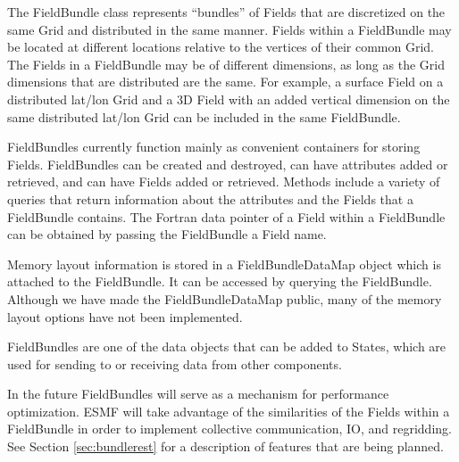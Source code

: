 
The FieldBundle class represents ``bundles'' of Fields that are 
discretized on the same Grid and distributed in the same manner.  
Fields within a FieldBundle may be located at different locations relative 
to the vertices of their common Grid.  The Fields in a FieldBundle may
be of different dimensions, as long as the Grid dimensions that 
are distributed are the same.  For example, a surface Field on 
a distributed lat/lon Grid and a 3D Field with an added vertical 
dimension on the same distributed lat/lon Grid can be included
in the same FieldBundle.
 
FieldBundles currently function mainly as convenient containers for storing 
Fields.  FieldBundles can be created and destroyed, can have attributes 
added or retrieved, and can have Fields added or retrieved.
Methods include a variety of queries that return information about 
the attributes and the Fields that a FieldBundle contains.  The Fortran 
data pointer of a Field within a FieldBundle can be obtained 
by passing the FieldBundle a Field name.  

Memory layout information is stored in a FieldBundleDataMap object 
which is attached to the FieldBundle.  It can be accessed by querying the 
FieldBundle.  Although we have made the FieldBundleDataMap public, many of 
the memory layout options have not been implemented.

FieldBundles are one of the data objects that can be added to States,
which are used for sending to or receiving data from other components.

In the future FieldBundles will serve as a mechanism for performance
optimization.  ESMF will take advantage of the similarities of the
Fields within a FieldBundle in order to implement collective communication,
IO, and regridding.  See Section \ref{sec:bundlerest} for a 
description of features that are being planned.





